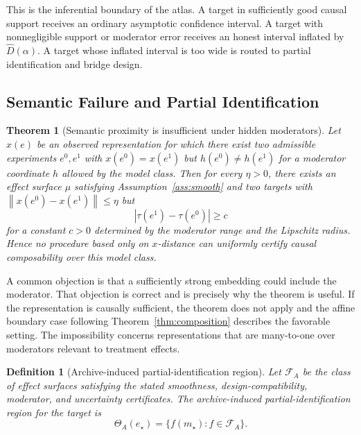 \documentclass[11pt]{article}
\numberwithin{equation}{section}
\newtheorem{definition}{Definition}[section]
\newtheorem{theorem}{Theorem}[section]
\newcommand{\1}{\mathbf 1}
\newcommand{\cF}{\mathcal F}
\newcommand{\norm}[1]{\left\lVert #1\right\rVert}
\newcommand{\abs}[1]{\left\lvert #1\right\rvert}
\begin{document}
This is the inferential boundary of the atlas.  A target in sufficiently good causal support receives an ordinary asymptotic confidence interval.  A target with nonnegligible support or moderator error receives an honest interval inflated by \(\widehat D(\alpha)\).  A target whose inflated interval is too wide is routed to partial identification and bridge design.

\subsection{Semantic Failure and Partial Identification}

\begin{theorem}[Semantic proximity is insufficient under hidden moderators]
\label{thm:impossibility}
Let \(x(e)\) be an observed representation for which there exist two admissible experiments \(e^0,e^1\) with \(x(e^0)=x(e^1)\) but \(h(e^0)\ne h(e^1)\) for a moderator coordinate \(h\) allowed by the model class.  Then for every \(\eta>0\), there exists an effect surface \(\mu\) satisfying Assumption~\ref{ass:smooth} and two targets with \(\norm{x(e^0)-x(e^1)}\le\eta\) but
\[
  \abs{\tau(e^1)-\tau(e^0)}\ge c
\]
for a constant \(c>0\) determined by the moderator range and the Lipschitz radius.  Hence no procedure based only on \(x\)-distance can uniformly certify causal composability over this model class.
\end{theorem}

A common objection is that a sufficiently strong embedding could include the moderator.  That objection is correct and is precisely why the theorem is useful.  If the representation is causally sufficient, the theorem does not apply and the affine boundary case following Theorem~\ref{thm:composition} describes the favorable setting.  The impossibility concerns representations that are many-to-one over moderators relevant to treatment effects.

\begin{definition}[Archive-induced partial-identification region]
Let \(\cF_A\) be the class of effect surfaces satisfying the stated smoothness, design-compatibility, moderator, and uncertainty certificates.  The archive-induced partial-identification region for the target is
\[
  \Theta_A(e_\star)=\{f(m_\star):f\in\cF_A\}.
\]
\end{definition}
\end{document}

